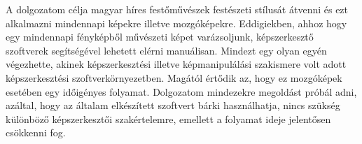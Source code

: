 \documentclass[12pt, a4paper, oneside]{book}
\theoremstyle{tetel}
\begin{document}
\newline
\indent
A dolgozatom célja magyar híres festőművészek festészeti stílusát átvenni és ezt alkalmazni mindennapi képekre illetve mozgóképekre. Eddigiekben, ahhoz hogy egy mindennapi fényképből művészeti képet varázsoljunk, képszerkesztő szoftverek segítségével lehetett elérni manuálisan. Mindezt egy olyan egyén végezhette, akinek képszerkesztési illetve képmanipulálási szakismere volt adott képszerkesztési szoftverkörnyezetben. Magától értődik az, hogy ez mozgóképek esetében egy időigényes folyamat. Dolgozatom mindezekre megoldást próbál adni, azáltal, hogy az általam elkészített szoftvert bárki használhatja, nincs szükség különböző képszerkesztői szakértelemre, emellett a folyamat ideje jelentősen csökkenni fog. 

\end{document}
